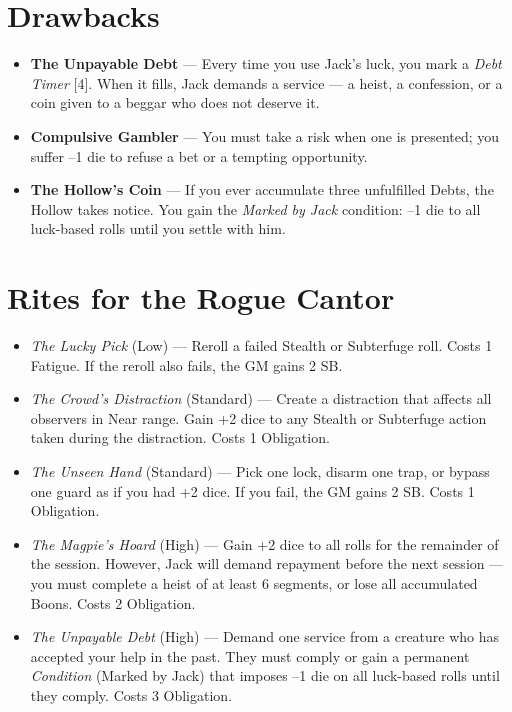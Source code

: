 \documentclass[10pt,twoside]{book}
\begin{document}
\section{Drawbacks}
\begin{itemize}
\item \textbf{The Unpayable Debt} --- Every time you use Jack's luck, you mark a \textit{Debt Timer } [4]. When it fills, Jack demands a service --- a heist, a confession, or a coin given to a beggar who does not deserve it.
\item \textbf{Compulsive Gambler} --- You must take a risk when one is presented; you suffer --1 die to refuse a bet or a tempting opportunity.
\item \textbf{The Hollow's Coin} --- If you ever accumulate three unfulfilled Debts, the Hollow takes notice. You gain the \textit{Marked by Jack} condition: --1 die to all luck-based rolls until you settle with him.
\end{itemize}

\section{Rites for the Rogue Cantor}
\begin{itemize}
\item \textit{The Lucky Pick} (Low) --- Reroll a failed Stealth or Subterfuge roll. Costs 1 Fatigue. If the reroll also fails, the GM gains 2 SB.
\item \textit{The Crowd's Distraction} (Standard) --- Create a distraction that affects all observers in Near range. Gain +2 dice to any Stealth or Subterfuge action taken during the distraction. Costs 1 Obligation.
\item \textit{The Unseen Hand} (Standard) --- Pick one lock, disarm one trap, or bypass one guard as if you had +2 dice. If you fail, the GM gains 2 SB. Costs 1 Obligation.
\item \textit{The Magpie's Hoard} (High) --- Gain +2 dice to all rolls for the remainder of the session. However, Jack will demand repayment before the next session --- you must complete a heist of at least 6 segments, or lose all accumulated Boons. Costs 2 Obligation.
\item \textit{The Unpayable Debt} (High) --- Demand one service from a creature who has accepted your help in the past. They must comply or gain a permanent \textit{Condition} (Marked by Jack) that imposes --1 die on all luck-based rolls until they comply. Costs 3 Obligation.
\end{itemize}
\end{document}
